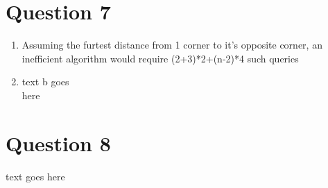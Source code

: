 \documentclass{article}
\begin{document}
\section*{Question 7}
\begin{enumerate}[label=\alph*)]
    \item Assuming the furtest distance from 1 corner to it's opposite corner, an inefficient algorithm would require (2+3)*2+(n-2)*4 such queries
    \item text b goes\\
        here
\end{enumerate}

\section*{Question 8}
text goes here
\end{document}
